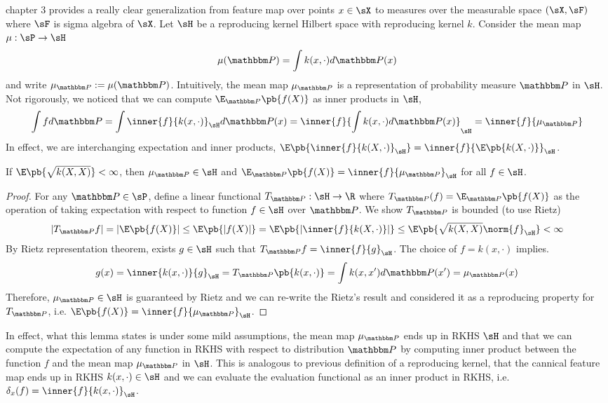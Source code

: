 \documentclass[11pt]{article}
\begin{document}
\cite{muandetKernelMeanEmbedding2017} chapter 3 provides a really clear generalization from feature map over points $x\in\sX$ to measures over the measurable space $(\sX,\sF)$ where $\sF$ is sigma algebra of $\sX$. Let $\sH$ be a reproducing kernel Hilbert space with reproducing kernel $k$. Consider the mean map $\mu:\sP\to\sH$
\begin{align}
    \mu(\bbP)
        = \int k(x,\cdot) d\bbP(x)
\end{align}
and write $\mu_{\bbP} := \mu(\bbP)$. Intuitively, the mean map $\mu_{\bbP}$ is a representation of probability measure $\bbP$ in $\sH$. Not rigorously, we noticed that we can compute $\E_{\bbP}\pb{f(X)}$ as inner products in $\sH$,
\[
    \int f d\bbP
        = \int \inner{f}{k(x,\cdot)}_{\sH} d\bbP(x)
        = \inner{f}{\int k(x,\cdot)d\bbP(x)}_{\sH}
        = \inner{f}{\mu_{\bbP}}
\]
In effect, we are interchanging expectation and inner products, $\E\pb{\inner{f}{k(X,\cdot)}_{\sH}} = \inner{f}{\E\pb{k(X,\cdot)}}_{\sH}$.
\begin{lemma}
    \label{lemma:mean_embedding_reproducing_property}
    If $\E\pb{\sqrt{k(X,X)}} < \infty$, then $\mu_{\bbP} \in \sH$ and $\E_{\bbP}\pb{f(X)} = \inner{f}{\mu_{\bbP}}_{\sH}$ for all $f\in\sH$.
\end{lemma}
\begin{proof}
    For any $\bbP\in\sP$, define a linear functional $T_{\bbP}:\sH\to\R$ where $T_{\bbP}(f) = \E_{\bbP}\pb{f(X)}$ as the operation of taking expectation with respect to function $f\in\sH$ over $\bbP$. We show $T_{\bbP}$ is bounded (to use Rietz)
    \begin{align*}
        |T_{\bbP}f|
            = |\E\pb{f(X)}|
            \leq \E\pb{|f(X)|}
            = \E\pb{ \left|  \inner{f}{k(X,\cdot)} \right| }
            \leq \E\pb{ \sqrt{k(X,X)} \norm{f}_{\sH} }
            < \infty
    \end{align*}
    By Rietz representation theorem, exists $g\in\sH$ such that $T_{\bbP} f = \inner{f}{g}_{\sH}$. The choice of $f = k(x,\cdot)$ implies.
    \[
        g(x)
            = \inner{k(x,\cdot)}{g}_{\sH} 
            = T_{\bbP}\pb{k(x,\cdot)}
            = \int k(x,x') d\bbP(x')
            = \mu_{\bbP}(x)
    \]
    Therefore, $\mu_{\bbP}\in\sH$ is guaranteed by Rietz and we can re-write the Rietz's result and considered it as a reproducing property for $T_{\bbP}$, i.e. $\E\pb{f(X)} = \inner{f}{\mu_{\bbP}}_{\sH}$.
\end{proof}
In effect, what this lemma states is under some mild assumptions, the mean map $\mu_{\bbP}$ ends up in RKHS $\sH$ and that we can compute the expectation of any function in RKHS with respect to distribution $\bbP$ by computing inner product between the function $f$ and the mean map $\mu_{\bbP}$ in $\sH$. This is analogous to previous definition of a reproducing kernel, that the cannical feature map ends up in RKHS $k(x,\cdot) \in \sH$ and we can evaluate the evaluation functional as an inner product in RKHS, i.e. $\delta_x(f) = \inner{f}{k(x,\cdot)}_{\sH}$. 
\end{document}
